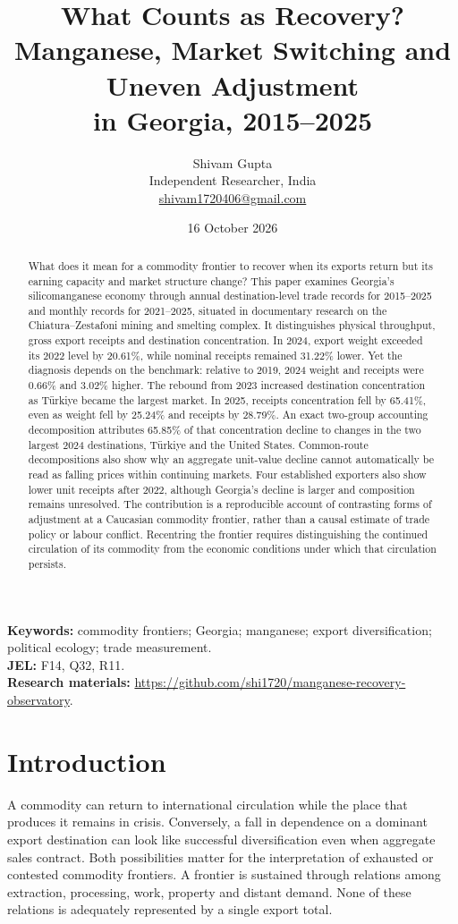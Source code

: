 \documentclass[11pt,a4paper]{article}
\title{\vspace{-14mm}\textbf{What Counts as Recovery?}\\[3mm]\large Manganese, Market Switching and Uneven Adjustment\\in Georgia, 2015--2025}
\author{Shivam Gupta\\\small Independent Researcher, India\\\small\href{mailto:shivam1720406@gmail.com}{shivam1720406@gmail.com}}
\date{16 October 2026}
\begin{document}
\maketitle\thispagestyle{empty}
\begin{abstract}
What does it mean for a commodity frontier to recover when its exports return but its earning capacity and market structure change? This paper examines Georgia's silicomanganese economy through annual destination-level trade records for 2015--2025 and monthly records for 2021--2025, situated in documentary research on the Chiatura--Zestafoni mining and smelting complex. It distinguishes physical throughput, gross export receipts and destination concentration. In 2024, export weight exceeded its 2022 level by 20.61\%, while nominal receipts remained 31.22\% lower. Yet the diagnosis depends on the benchmark: relative to 2019, 2024 weight and receipts were 0.66\% and 3.02\% higher. The rebound from 2023 increased destination concentration as T\"urkiye became the largest market. In 2025, receipts concentration fell by 65.41\%, even as weight fell by 25.24\% and receipts by 28.79\%. An exact two-group accounting decomposition attributes 65.85\% of that concentration decline to changes in the two largest 2024 destinations, T\"urkiye and the United States. Common-route decompositions also show why an aggregate unit-value decline cannot automatically be read as falling prices within continuing markets. Four established exporters also show lower unit receipts after 2022, although Georgia's decline is larger and composition remains unresolved. The contribution is a reproducible account of contrasting forms of adjustment at a Caucasian commodity frontier, rather than a causal estimate of trade policy or labour conflict. Recentring the frontier requires distinguishing the continued circulation of its commodity from the economic conditions under which that circulation persists.
\end{abstract}
\noindent\textbf{Keywords:} commodity frontiers; Georgia; manganese; export diversification; political ecology; trade measurement.\\
\textbf{JEL:} F14, Q32, R11.\\
\textbf{Research materials:} \url{https://github.com/shi1720/manganese-recovery-observatory}.

\section{Introduction}
A commodity can return to international circulation while the place that produces it remains in crisis. Conversely, a fall in dependence on a dominant export destination can look like successful diversification even when aggregate sales contract. Both possibilities matter for the interpretation of exhausted or contested commodity frontiers. A frontier is sustained through relations among extraction, processing, work, property and distant demand. None of these relations is adequately represented by a single export total.
\end{document}
